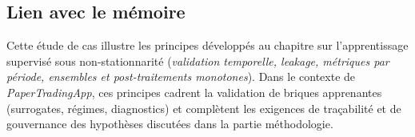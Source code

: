\documentclass[11pt,a4paper]{article}
\newcommand{\1}{\mathbf{1}}
\begin{document}
\subsection*{Lien avec le m\'emoire}
Cette \'etude de cas illustre les principes d\'evelopp\'es au chapitre sur l'apprentissage supervis\'e sous non-stationnarit\'e
(\emph{validation temporelle, leakage, m\'etriques par p\'eriode, ensembles et post-traitements monotones}). Dans le contexte de
\emph{PaperTradingApp}, ces principes cadrent la validation de briques apprenantes (surrogates, r\'egimes, diagnostics) et compl\`etent les exigences
de tra\c{c}abilit\'e et de gouvernance des hypoth\`eses discut\'ees dans la partie m\'ethodologie.
\end{document}
